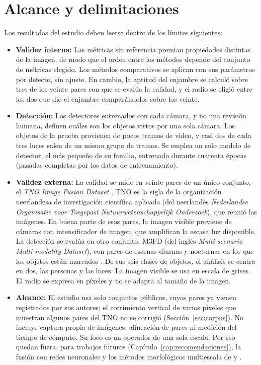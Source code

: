 \section{Alcance y delimitaciones}
\label{sec:limitaciones}

Los resultados del estudio deben leerse dentro de los límites siguientes:

\begin{itemize}
\item \textbf{Validez interna:} Las métricas sin referencia premian propiedades distintas de la imagen,
de modo que el orden entre los métodos depende del conjunto de métricas elegido. Los métodos
comparativos se aplican con sus parámetros por defecto, sin ajuste. En cambio, la aptitud del enjambre
se calculó sobre tres de los veinte pares con que se evalúa la calidad, y el radio se eligió entre los
dos que dio el enjambre comparándolos sobre los veinte.
\item \textbf{Detección:} Los detectores entrenados con cada cámara, y no una revisión humana, definen
cuáles son los objetos vistos por una sola cámara. Los objetos de la prueba provienen de pocos tramos de video, y casi dos
de cada tres luces salen de un mismo grupo de tramos. Se emplea un solo modelo de detector, el más
pequeño de su familia, entrenado durante cuarenta épocas (pasadas completas por los datos de
entrenamiento).
\item \textbf{Validez externa:} La calidad se mide en veinte pares de un único conjunto, el
\textit{TNO Image Fusion Dataset} \parencite{toet2014, toet2017}. TNO es la sigla de la organización neerlandesa
de investigación científica aplicada (del neerlandés \textit{Nederlandse Organisatie voor Toegepast
Natuurwetenschappelijk Onderzoek}), que reunió las imágenes. En buena parte de esos pares, la imagen
visible proviene de cámaras con intensificador de imagen, que amplifican la escasa luz disponible. La
detección se evalúa en otro conjunto, M3FD (del inglés \textit{Multi-scenario Multi-modality
Dataset}), con pares de escenas diurnas y nocturnas en los que los objetos están marcados
\parencite{liu2022}. De sus seis clases de objetos, el análisis se centra en dos, las personas y las
luces. La imagen visible se usa en escala de grises. El radio se expresa en píxeles y no se adapta al
tamaño de la imagen.
\item \textbf{Alcance:} El estudio usa solo conjuntos públicos, cuyos pares ya vienen registrados por sus
autores; el corrimiento vertical de varios píxeles que muestran algunos pares del TNO no se corrigió
(Sección~\ref{sec:corpus}). No incluye captura propia de imágenes, alineación de pares ni medición del tiempo de cómputo.
Su foco es un operador de una sola escala. Por eso quedan fuera, para trabajos futuros
(Capítulo~\ref{cap:recomendaciones}), la fusión con redes neuronales y los métodos morfológicos
multiescala de \textcite{bai2013} y \textcite{roman2020}.
\end{itemize}

